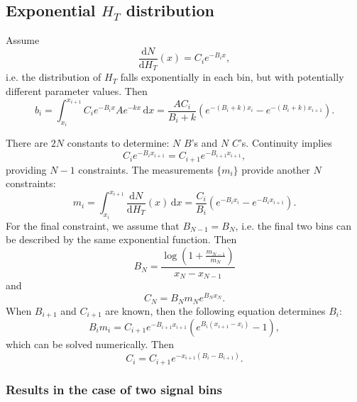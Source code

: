 \subsection{Exponential $H_T$ distribution}
\label{sec:expHt}
Assume
\begin{equation}
\frac{\mathrm{d}N}{\mathrm{d}H_T}(x) = C_{i}e^{-B_{i}x}, 
\end{equation}
i.e. the distribution of $H_T$ falls exponentially in each bin, but with potentially different parameter values.
Then
\begin{equation}
b_i = \int_{x_i}^{x_{i+1}}\! C_{i}e^{-B_{i}x} Ae^{-kx}\, \mathrm{d}x = \frac{AC_i}{B_i+k}(e^{-(B_i+k)x_{i}} - e^{-(B_i+k)x_{i+1}}).
\label{eq:biExp}
\end{equation}

There are $2N$ constants to determine: $N$ $B$'s and $N$ $C$'s.
Continuity implies
\begin{equation}
C_{i}e^{-B_{i}x_{i+1}} = C_{i+1}e^{-B_{i+1}x_{i+1}},
\end{equation}
providing $N-1$ constraints.
The measurements $\{m_i\}$ provide another $N$ constraints:
\begin{equation}
m_i = \int_{x_i}^{x_{i+1}}\! \frac{\mathrm{d}N}{\mathrm{d}H_T}(x) \, \mathrm{d}x = \frac{C_i}{B_i}(e^{-B_{i}x_{i}} - e^{-B_{i}x_{i+1}}).
\end{equation}
For the final constraint, we assume that $B_{N-1} = B_N$, i.e. the final two bins can be described by the same exponential function. 
Then 
\begin{equation}
B_N = \frac{\log(1+\frac{m_{N-1}}{m_N})}{x_N - x_{N-1}}
\end{equation}
and
\begin{equation}
C_N = B_{N}m_{N}e^{B_{N}x_{N}}.
\end{equation}
When $B_{i+1}$ and $C_{i+1}$ are known, then the following equation determines $B_i$:
\begin{equation}
B_i m_i = C_{i+1} e^{-B_{i+1}x_{i+1}}(e^{B_i (x_{i+1}-x_i)}-1), 
\end{equation}
which can be solved numerically.  Then
\begin{equation}
C_i = C_{i+1} e^{-x_{i+1}(B_i-B_{i+1})}.
\end{equation}

\subsubsection{Results in the case of two signal bins}


